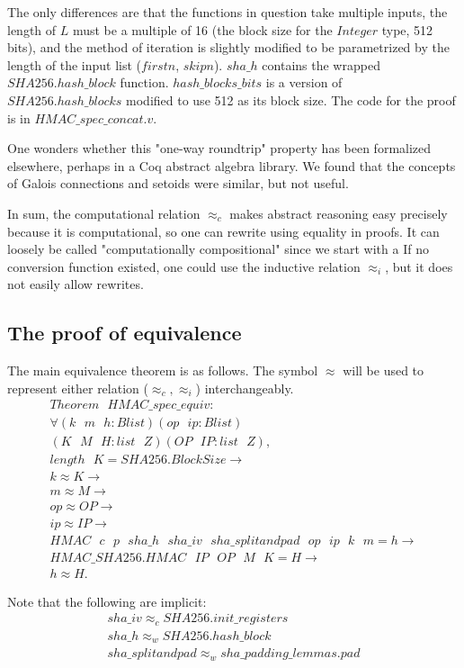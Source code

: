\documentclass[twocolumn,showpacs,%
  nofootinbib,aps,superscriptaddress,%
  eqsecnum,prd,notitlepage,showkeys,10pt]{revtex4-1}
\newcommand{\eqn}[1] {\begin{gather*}#1\end{gather*}}
\newcommand{\s} {\textrm{ }}
\begin{document}
The only differences are that the functions in question take multiple inputs, the length of $L$ must be a multiple of 16 (the block size for the $Integer$ type, 512 bits), and the method of iteration is slightly modified to be parametrized by the length of the input list ($firstn$, $skipn$). $sha\_h$ contains the wrapped $SHA256.hash\_block$ function. $hash\_blocks\_bits$ is a version of $SHA256.hash\_blocks$ modified to use 512 as its block size. The code for the proof is in $HMAC\_spec\_concat.v$.

One wonders whether this "one-way roundtrip" property has been formalized elsewhere, perhaps in a Coq abstract algebra library. We found that the concepts of Galois connections and setoids were similar, but not useful.

In sum, the computational relation $\approx_c$ makes abstract reasoning easy precisely because it is computational, so one can rewrite using equality in proofs. It can loosely be called "computationally compositional" since we start with a  If no conversion function existed, one could use the inductive relation $\approx_i$, but it does not easily allow rewrites.

\subsection{The proof of equivalence}

The main equivalence theorem is as follows. The symbol $\approx$ will be used to represent either relation ($\approx_c, \approx_i$) interchangeably. 
\eqn{
Theorem \s HMAC\_spec\_equiv : \\
\forall
                            (k \s m \s h : Blist) (op \s ip : Blist) \\
                            (K \s M \s H : list \s Z) (OP \s IP : list \s Z), \\
  length \s K = SHA256.BlockSize \rightarrow \\
  k \approx K \rightarrow \\
  m \approx M \rightarrow \\
  op \approx OP \rightarrow \\
  ip \approx IP \rightarrow \\
  HMAC \s c \s p \s sha\_h \s sha\_iv \s sha\_splitandpad \s op \s ip \s k \s m = h \rightarrow \\
  HMAC\_SHA256.HMAC \s IP \s OP \s M \s K = H \rightarrow \\
  h \approx H.
}

Note that the following are implicit: 
\eqn{
	sha\_iv \approx_c SHA256.init\_registers \\
	sha\_h \approx_w SHA256.hash\_block \\
	sha\_splitandpad \approx_w sha\_padding\_lemmas.pad
}
\end{document}
